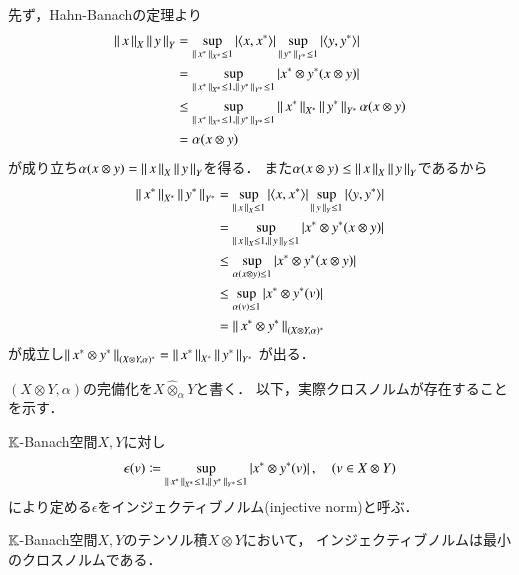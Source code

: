 	\begin{prf}
		先ず，Hahn-Banachの定理より
		\begin{align}
			\Norm{x}{X} \Norm{y}{Y} 
			&= \sup{\Norm{x^*}{X^*} \leq 1}{\left| \inprod<x,x^*> \right|} 
				\sup{\Norm{y^*}{Y^*} \leq 1}{\left| \inprod<y,y^*> \right|} \\
			&= \sup{\Norm{x^*}{X^*} \leq 1,\Norm{y^*}{Y^*} \leq 1}{\left| x^* \otimes y^* (x \otimes y) \right|} \\
			&\leq \sup{\Norm{x^*}{X^*} \leq 1,\Norm{y^*}{Y^*} \leq 1}{\Norm{x^*}{X^*} \Norm{y^*}{Y^*}}\alpha(x \otimes y) \\
			&= \alpha(x \otimes y)
		\end{align}
		が成り立ち$\alpha(x \otimes y) = \left\|\, x\, \right\|_{X} \left\|\, y\, \right\|_{Y}$を得る．
		また$\alpha(x \otimes y) \leq \left\|\, x\, \right\|_{X} \left\|\, y\, \right\|_{Y}$であるから
		\begin{align}
			\Norm{x^*}{X^*} \Norm{y^*}{Y^*} 
			&= \sup{\Norm{x}{X} \leq 1}{\left| \inprod<x,x^*> \right|}
				\sup{\Norm{y}{Y} \leq 1}{\left| \inprod<y,y^*> \right|} \\
			&= \sup{\Norm{x}{X} \leq 1,\Norm{y}{Y} \leq 1}{\left| x^* \otimes y^* (x \otimes y) \right|} \\
			&\leq \sup{\alpha(x \otimes y) \leq 1}{\left| x^* \otimes y^* (x \otimes y) \right|} \\
			&\leq \sup{\alpha(v) \leq 1}{\left| x^* \otimes y^* (v) \right|} \\
			&= \Norm{x^* \otimes y^*}{(X \otimes Y, \alpha)^*}
		\end{align}
		が成立し$\left\|\, x^* \otimes y^*\, \right\|_{(X \otimes Y, \alpha)^*} = \left\|\, x^*\, \right\|_{X^*} \left\|\, y^*\, \right\|_{Y^*}$
		が出る．
		\QED
	\end{prf}
	
	$(X \otimes Y, \alpha)$の完備化を$X \hat{\otimes}_{\alpha} Y$と書く．
	以下，実際クロスノルムが存在することを示す．
	\begin{screen}
		\begin{dfn}[インジェクティブノルム]
			$\mathbb{K}$-Banach空間$X,Y$に対し
			\begin{align}
				\epsilon(v) \coloneqq
				\operatorname*{sup}_{\left\|\, x^*\, \right\|_{X^*}\leq 1,\left\|\, y^*\, \right\|_{Y^*} \leq 1} \left| x^* \otimes y^* (v) \right|,
				\quad (v \in X \otimes Y)
			\end{align}
			により定める$\epsilon$をインジェクティブノルム(injective norm)と呼ぶ．
		\end{dfn}
	\end{screen}
	
	\begin{screen}
		\begin{thm}[インジェクティブノルムは最小のクロスノルム]
		\label{thm:injective_norm_is_the_minimum_cross_norm}
			$\mathbb{K}$-Banach空間$X,Y$のテンソル積$X \otimes Y$において，
			インジェクティブノルムは最小のクロスノルムである．
		\end{thm}
	\end{screen}
	
